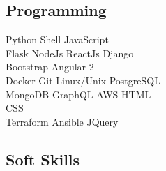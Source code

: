 \documentclass[]{deedy-resume-openfont}
\begin{document}
\begin{minipage}[t]{0.33\textwidth}
\subsection{Programming}
Python \textbullet{}   Shell \textbullet{} JavaScript \\
Flask \textbullet{} NodeJs \textbullet{} ReactJs \textbullet{} Django \\ Bootstrap \textbullet{} Angular 2 \\
Docker \textbullet{} Git \textbullet{} Linux/Unix \textbullet{} PostgreSQL \\
MongoDB \textbullet{} GraphQL \textbullet{} AWS \textbullet{} HTML \\
CSS \\ 
Terraform \textbullet{} Ansible \textbullet{} JQuery\\
\subsection{Soft Skills}
\sectionsep

%
%

\end{minipage} 
\hfill
\end{document}
